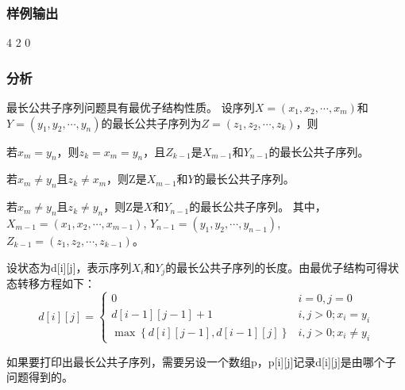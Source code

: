 \subsubsection{样例输出}
\begin{Code}
4
2
0
\end{Code}

\subsubsection{分析}
最长公共子序列问题具有最优子结构性质。
设序列$X=(x_1,x_2,\cdots,x_m)$和$Y=(y_1,y_2,\cdots,y_n)$的最长公共子序列为$Z=(z_1,z_2,\cdots,z_k)$，则
\begindot
\item 若$x_m=y_n$，则$z_k=x_m=y_n$，且$Z_{k-1}$是$X_{m-1}$和$Y_{n-1}$的最长公共子序列。
\item 若$x_m \neq y_n$且$z_k \neq x_m$，则Z是$X_{m-1}$和$Y$的最长公共子序列。
\item 若$x_m \neq y_n$且$z_k \neq y_n$，则Z是$X$和$Y_{n-1}$的最长公共子序列。
\myenddot
其中，$X_{m-1}=(x_1,x_2,\cdots,x_{m-1})$, $Y_{n-1}=(y_1,y_2,\cdots,y_{n-1})$, $Z_{k-1}=(z_1,z_2,\cdots,z_{k-1})$。

设状态为d[i][j]，表示序列$X_i$和$Y_j$的最长公共子序列的长度。由最优子结构可得状态转移方程如下：
$$
d[i][j]=\begin{cases}
0 & i=0,j=0\\
d[i-1][j-1]+1 & i,j>0; x_i=y_i \\
\max\left\{d[i][j-1],d[i-1][j]\right\} & i,j>0; x_i \neq y_i
\end{cases}
$$

如果要打印出最长公共子序列，需要另设一个数组p，p[i][j]记录d[i][j]是由哪个子问题得到的。

